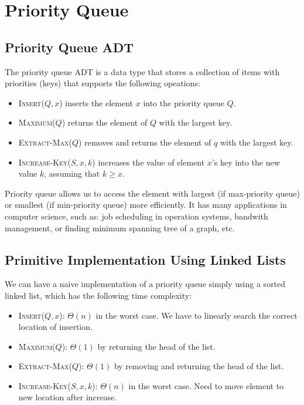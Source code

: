 \section{Priority Queue} 

\subsection{Priority Queue ADT}

The priority queue ADT is a data type that stores a collection of items with priorities (keys) that supports the following opeations:

\begin{itemize}
    \item \textsc{Insert}($Q, x$) inserts the element $x$ into the priority queue $Q$.
    \item \textsc{Maximum}($Q$) returns the element of $Q$ with the largest key.
    \item \textsc{Extract-Max}($Q$) removes and returns the element of $q$ with the largest key.
    \item \textsc{Increase-Key}($S,x,k$) increases the value of element $x$'s key into the new value $k$, assuming that $k \geq x$.
\end{itemize}

Priority queue allows us to access the element with largest (if max-priority queue) or smallest (if min-priority queue) more efficiently. It has many applications in computer science, such as: job scheduling in operation systems, bandwith management, or finding minimum spanning tree of a graph, etc.

\subsection{Primitive Implementation Using Linked Lists}

We can have a naive implementation of a priority queue simply using a sorted linked list, which has the following time complexity:
\begin{itemize}
    \item \textsc{Insert}($Q, x$): $\Theta(n)$ in the worst case. We have to linearly search the correct location of insertion.
    \item \textsc{Maximum}($Q$): $\Theta(1)$ by returning the head of the list.
    \item \textsc{Extract-Max}($Q$): $\Theta(1)$ by removing and returning the head of the list.
    \item \textsc{Increase-Key}($S,x,k$): $\Theta(n)$ in the worst case. Need to move element to new location after increase.
\end{itemize}

